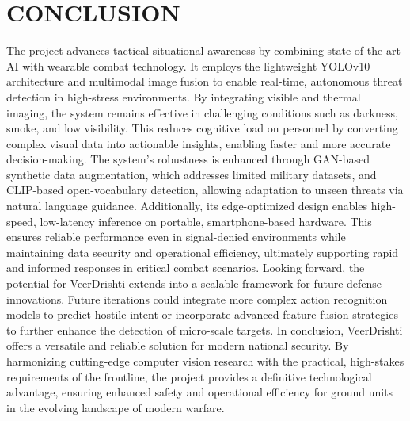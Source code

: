 \chapter{CONCLUSION}
The project advances tactical situational awareness by combining state-of-the-art AI with wearable combat technology. It employs the lightweight YOLOv10 architecture and multimodal image fusion to enable real-time, autonomous threat detection in high-stress environments. By integrating visible and thermal imaging, the system remains effective in challenging conditions such as darkness, smoke, and low visibility. This reduces cognitive load on personnel by converting complex visual data into actionable insights, enabling faster and more accurate decision-making. The system’s robustness is enhanced through GAN-based synthetic data augmentation, which addresses limited military datasets, and CLIP-based open-vocabulary detection, allowing adaptation to unseen threats via natural language guidance. Additionally, its edge-optimized design enables high-speed, low-latency inference on portable, smartphone-based hardware. This ensures reliable performance even in signal-denied environments while maintaining data security and operational efficiency, ultimately supporting rapid and informed responses in critical combat scenarios. Looking forward, the potential for VeerDrishti extends into a scalable framework for future defense innovations. Future iterations could integrate more complex action recognition models to predict hostile intent or incorporate advanced feature-fusion strategies to further enhance the detection of micro-scale targets. In conclusion, VeerDrishti offers a versatile and reliable solution for modern national security. By harmonizing cutting-edge computer vision research with the practical, high-stakes requirements of the frontline, the project provides a definitive technological advantage, ensuring enhanced safety and operational efficiency for ground units in the evolving landscape of modern warfare.